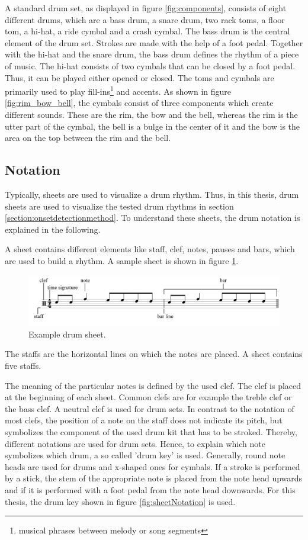 A standard drum set, as displayed in figure \ref{fig:components}, consists of eight different drums, which are a bass drum, a snare drum, two rack toms, a floor tom, a hi-hat, a ride cymbal and a crash cymbal. The bass drum is the central element of the drum set. Strokes are made with the help of a foot pedal. Together with the hi-hat and the snare drum, the bass drum defines the rhythm of a piece of music. The hi-hat consists of two cymbals that can be closed by a foot pedal. Thus, it can be played either opened or closed. The toms and cymbals are primarily used to play fill-ins\footnote{musical phrases between melody or song segments} and accents. As shown in figure \ref{fig:rim_bow_bell}, the cymbals consist of three components which create different sounds. These are the rim, the bow and the bell, whereas the rim is the utter part of the cymbal, the bell is a bulge in the center of it and the bow is the area on the top between the rim and the bell.


\subsection{Notation}

Typically, sheets are used to visualize a drum rhythm. Thus, in this thesis, drum sheets are used to visualize the tested drum rhythms in section \ref{section:onsetdetectionmethod}. To understand these sheets, the drum notation is explained in the following.

A sheet contains different elements like staff, clef, notes, pauses and bars, which are used to build a rhythm. A sample sheet is shown in figure \ref{fig:sheetExample}.

\begin{figure}[h]
	\centering
	\includegraphics[width=\textwidth]{images/drumsandsheets/example.png}
	\caption{Example drum sheet.}
	\label{fig:sheetExample}
\end{figure}

The staffs are the horizontal lines on which the notes are placed. A sheet contains five staffs. 

The meaning of the particular notes is defined by the used clef. The clef is placed at the beginning of each sheet. Common clefs are for example the treble clef or the bass clef. A neutral clef is used for drum sets. In contrast to the notation of most clefs, the position of a note on the staff does not indicate its pitch, but symbolizes the component of the used drum kit that has to be stroked. Thereby, different notations are used for drum sets. Hence, to explain which note symbolizes which drum, a so called 'drum key' is used. Generally, round note heads are used for drums and x-shaped ones for cymbals. If a stroke is performed by a stick, the stem of the appropriate note is placed from the note head upwards and if it is performed with a foot pedal from the note head downwards. For this thesis, the drum key shown in figure \ref{fig:sheetNotation} is used.

